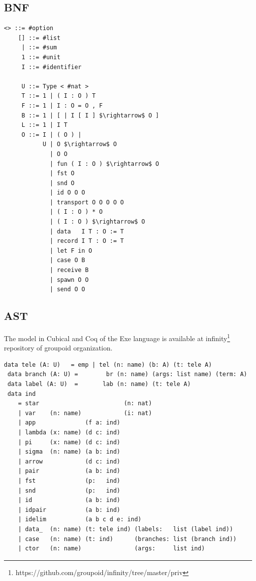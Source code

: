 \documentclass[11pt,oneside]{article}
\begin{document}
\subsection{BNF}

\begin{lstlisting}[mathescape=true]
    <> ::= #option
    [] ::= #list
     | ::= #sum
     1 ::= #unit
     I ::= #identifier

     U ::= Type < #nat >
     T ::= 1 | ( I : O ) T
     F ::= 1 | I : O = O , F
     B ::= 1 | [ | I [ I ] $\rightarrow$ O ]
     L ::= 1 | I T
     O ::= I | ( O ) |
           U | O $\rightarrow$ O
             | O O
             | fun ( I : O ) $\rightarrow$ O
             | fst O
             | snd O
             | id O O O
             | transport O O O O O
             | ( I : O ) * O
             | ( I : O ) $\rightarrow$ O
             | data   I T : O := T
             | record I T : O := T
             | let F in O
             | case O B
             | receive B
             | spawn O O
             | send O O
\end{lstlisting}

\newpage
\subsection{AST}

The model in Cubical and Coq of the Exe language is available at
infinity\footnote{https://github.com/groupoid/infinity/tree/master/priv}
repository of groupoid organization.

\begin{lstlisting}[mathescape=true]
 data tele (A: U)   = emp | tel (n: name) (b: A) (t: tele A)
 data branch (A: U) =        br (n: name) (args: list name) (term: A)
 data label (A: U)  =       lab (n: name) (t: tele A)
 data ind
    = star                        (n: nat)
    | var    (n: name)            (i: nat)
    | app              (f a: ind)
    | lambda (x: name) (d c: ind)
    | pi     (x: name) (d c: ind)
    | sigma  (n: name) (a b: ind)
    | arrow            (d c: ind)
    | pair             (a b: ind)
    | fst              (p:   ind)
    | snd              (p:   ind)
    | id               (a b: ind)
    | idpair           (a b: ind)
    | idelim           (a b c d e: ind)
    | data_  (n: name) (t: tele ind) (labels:   list (label ind))
    | case   (n: name) (t: ind)      (branches: list (branch ind))
    | ctor   (n: name)               (args:     list ind)
\end{lstlisting}
\end{document}
